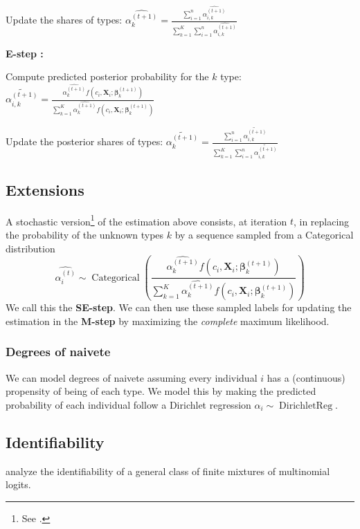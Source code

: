 \documentclass[oneside,11pt]{article}
\begin{document}
\begin{algorithm}[H]
{{Update the shares of types:\;
$\widehat{\alpha_k^{(t+1)}} = \frac{\sum_{i=1}^n\widehat{\alpha_{i,k}^{(t+1)}}}{\sum_{k=1}^{K}\sum_{i=1}^n\widehat{\alpha_{i,k}^{(t+1)}}}$\;


\textbf{E-step :}

Compute predicted posterior probability  for the $k$ type: \;
$\widetilde{\alpha_{i,k}^{(t+1)}} = \frac{\widehat{\alpha_k^{(t+1)}}f(c_i,\mathbf{X}_i; \bm\beta_{k}^{(t+1)})}{\sum_{k=1}^K\widehat{\alpha_k^{(t+1)}}f(c_i,\mathbf{X}_i; \bm\beta_{k}^{(t+1)})}$\;


}
Update the posterior shares of types:\;
$\widetilde{\alpha_k^{(t+1)}} = \frac{\sum_{i=1}^n\widetilde{\alpha_{i,k}^{(t+1)}}}{\sum_{k=1}^{K}\sum_{i=1}^n\widetilde{\alpha_{i,k}^{(t+1)}}}$\;
}
\end{algorithm}


\subsection{Extensions}

A stochastic version\footnote{See \cite{nielsen}.} of the estimation above consists, at iteration $t$, in replacing the probability of the unknown types $k$ by a sequence sampled from a Categorical distribution
\[\widehat{\alpha_{i}^{(t)}}\sim \operatorname{Categorical}\left(\frac{\widehat{\alpha_k^{(t+1)}}f(c_i,\mathbf{X}_i; \bm\beta_{k}^{(t+1)})}{\sum_{k=1}^K\widehat{\alpha_k^{(t+1)}}f(c_i,\mathbf{X}_i; \bm\beta_{k}^{(t+1)})}\right)\] 
We call this the \textbf{SE-step}. We can then use these sampled labels for updating the estimation in the \textbf{M-step} by maximizing the \emph{complete} maximum likelihood. 
 
 
\subsubsection{Degrees of naivete}
We can model degrees of naivete assuming every individual $i$ has a (continuous) propensity of being of each type. We model this by making the predicted probability of each individual follow a Dirichlet regression $\alpha_{i} \sim \operatorname{DirichletReg}$.


\subsection{Identifiability}
\cite{grun} analyze the identifiability of a general class of finite mixtures of multinomial logits.



\newpage
\clearpage

%
%


\end{document}

